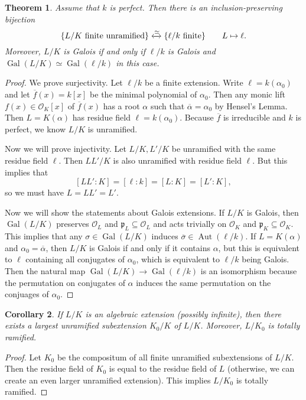 \documentclass[leqno, openany]{memoir}
\newtheorem{thm}{Theorem}[section]
\newtheorem{cor}[thm]{Corollary}
\theoremstyle{definition}
\theoremstyle{remark}
\theoremstyle{plain}
\theoremstyle{definition}
\theoremstyle{remark}
\newcommand{\mc}[1]{\mathcal{#1}}
\newcommand{\mf}[1]{\mathfrak{#1}}
\newcommand{\ol}[1]{\overline{#1}}
\DeclareMathOperator{\Aut}{Aut}
\DeclareMathOperator{\Gal}{Gal}
\begin{document}
\begin{thm}
    Assume that $k$ is perfect. Then there is an inclusion-preserving bijection
    \[ \qty{L/K\ \text{finite unramified}} \xleftrightarrow{\simeq} \qty{\ell / k\ \text{finite}} \qquad L \mapsto \ell. \]
    Moreover, $L/K$ is Galois if and only if $\ell/k$ is Galois and $\Gal(L/K) \simeq \Gal(\ell/k)$ in this case.
\end{thm}

\begin{proof}
    We prove surjectivity. Let $\ell / k$ be a finite extension. Write $\ell = k(\alpha_0)$ and let $\ol{f}(x) = k[x]$ be the minimal polynomial of $\alpha_0$. Then any monic lift $f(x) \in \mc{O}_K[x]$ of $\ol{f}(x)$ has a root $\alpha$ such that $\ol{\alpha} = \alpha_0$ by Hensel's Lemma. Then $L = K(\alpha)$ has residue field $\ell = k(\alpha_0)$. Because $\ol{f}$ is irreducible and $k$ is perfect, we know $L/K$ is unramified.

    Now we will prove injectivity. Let $L/K, L'/K$ be unramified with the same residue field $\ell$. Then $LL'/K$ is also unramified with residue field $\ell$. But this implies that
    \[ [LL' : K] = [\ell : k] = [L : K] = [L' : K], \]
    so we must have $L = LL' = L'$.
    
    Now we will show the statements about Galois extensions. If $L/K$ is Galois, then $\Gal(L/K)$ preserves $\mc{O}_L$ and $\mf{p}_L \subseteq \mc{O}_L$ and acts trivially on $\mc{O}_K$ and $\mf{p}_K \subseteq \mc{O}_K$. This implies that any $\sigma \in \Gal(L/K)$ induces $\ol{\sigma} \in \Aut(\ell/k)$. If $L = K(\alpha)$ and $\alpha_0 = \ol{\alpha}$, then $L/K$ is Galois if and only if it contains $\alpha$, but this is equivalent to $\ell$ containing all conjugates of $\alpha_0$, which is equivalent to $\ell/k$ being Galois. Then the natural map $\Gal(L/K) \to \Gal(\ell / k)$ is an isomorphism because the permutation on conjugates of $\alpha$ induces the same permutation on the conjuages of $\alpha_0$.
\end{proof}

\begin{cor}
    If $L/K$ is an algebraic extension (possibly infinite), then there exists a largest unramified subextension $K_0 / K$ of $L/K$. Moreover, $L/K_0$ is totally ramified.
\end{cor}

\begin{proof}
    Let $K_0$ be the compositum of all finite unramified subextensions of $L/K$. Then the residue field of $K_0$ is equal to the residue field of $L$ (otherwise, we can create an even larger unramified extension). This implies $L/K_0$ is totally ramified.
\end{proof}
\end{document}
